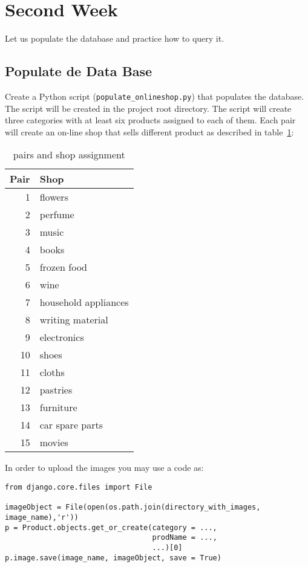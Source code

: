 \documentclass[12pt]{article} %
\newcommand{\proyecto}{\texttt{onlineshop}}%
\newcommand{\populatescript}{\texttt{populate\_\proyecto.py}}
\begin{document}

\section{Second Week} %
Let us populate the database and practice how to query it.

\subsection{Populate de Data Base}
Create a Python script  (\populatescript) that populates the database. The script will be created in the project root directory. The script will create three categories with at least six products assigned to each of them. Each pair will create an on-line shop that sells different product as described in table~\ref{asignacion}:

\begin{table}[H]
\begin{tabular}{rl}
\hline
Pair & Shop \\ \hline
1  & flowers    \\
2  & perfume  \\
3  & music    \\
4  & books    \\
5  & frozen food    \\
6  & wine    \\
7  & household appliances  \\
8  & writing material    \\
9  & electronics\\
10  & shoes\\
11  &cloths\\
12  & pastries  \\
13  & furniture    \\
14  & car spare parts    \\
15  & movies    \\ \hline
\end{tabular}
\centering
\caption{pairs and shop assignment}
\label{asignacion}
\end{table}

In order to upload the images you may use a code as:

\begin{verbatim}
from django.core.files import File

imageObject = File(open(os.path.join(directory_with_images, image_name),'r'))
p = Product.objects.get_or_create(category = ...,
                                  prodName = ...,
                                  ...)[0]
p.image.save(image_name, imageObject, save = True)
\end{verbatim}
\end{document}
